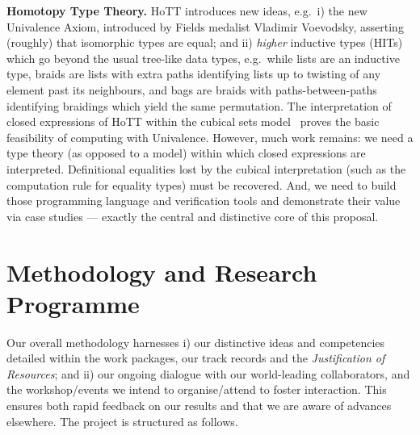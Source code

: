 \documentclass[a4paper,11pt]{article}
\newcommand{\eg}{{e.g.}\ }
\begin{document}
{\bf Homotopy Type Theory.} HoTT introduces new ideas, \eg i) the new
Univalence Axiom, introduced by Fields medalist Vladimir Voevodsky,
asserting (roughly) that isomorphic types are equal; and ii)
\emph{higher} inductive types (HITs) which go beyond the usual
tree-like data types, \eg while lists are an inductive type, braids
are lists with extra paths identifying lists up to twisting of any
element past its neighbours, and bags are braids with
paths-between-paths identifying braidings which yield the same
permutation.  The interpretation of closed expressions of HoTT within
the cubical sets model~\cite{BezemM:cubsmt, nominal} proves the basic
feasibility of computing with Univalence.  However, much work remains:
we need a type theory (as opposed to a model) within which closed
expressions are interpreted.  Definitional equalities lost by the
cubical interpretation (such as the computation rule for equality
types) must be recovered. And, we need to build those programming
language and verification tools and demonstrate their value via case
studies --- exactly the central and distinctive core of this proposal.




\vspace*{-0.2in}

\section{Methodology and Research Programme}
\vspace*{-0.1in}

Our overall methodology harnesses i) our distinctive
ideas and competencies detailed within the work packages, our track records and the {\em
  Justification of Resources}; and ii) our ongoing dialogue with our
world-leading collaborators, and the workshop/events we intend to
organise/attend to foster interaction. This ensures both rapid
feedback on our results and that we are aware of advances elsewhere. The
project is structured as follows.
\end{document}
